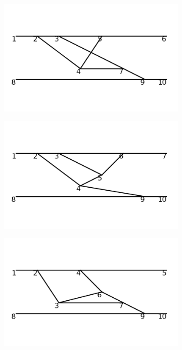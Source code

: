 \documentclass[11pt,a4paper,twoside,pdf]{article}
\numberwithin{equation}{section}
\begin{document}
\begin{figure}[h!]
\begin{subfigure}[t]{0.16\textwidth}
    \end{subfigure}
    \hfill
    \begin{subfigure}[t]{0.16\textwidth}
        \centering
        \includegraphics[width=\textwidth]{plots/order6_2to2/42.png}
    \end{subfigure}
    \hfill
    \begin{subfigure}[t]{0.16\textwidth}
        \centering
        \includegraphics[width=\textwidth]{plots/order6_2to2/43.png}
    \end{subfigure}
    \hfill
    \begin{subfigure}[t]{0.16\textwidth}
        \centering
        \includegraphics[width=\textwidth]{plots/order6_2to2/44.png}

\end{subfigure}
\end{figure}
\end{document}
